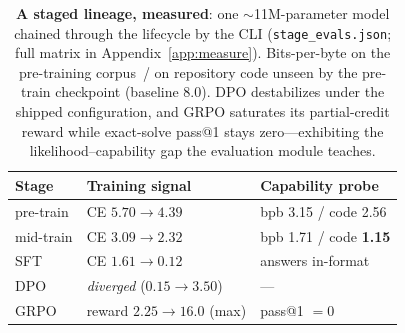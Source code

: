 \begin{table}[t]
\centering
\small
\begin{tabular}{@{}lll@{}}
\toprule
\textbf{Stage} & \textbf{Training signal} & \textbf{Capability probe} \\
\midrule
pre-train & CE $5.70{\to}4.39$ & bpb 3.15 / code 2.56 \\
mid-train & CE $3.09{\to}2.32$ & bpb 1.71 / code \textbf{1.15} \\
SFT       & CE $1.61{\to}0.12$ & answers in-format \\
DPO       & \emph{diverged} ($0.15{\to}3.50$) & --- \\
GRPO      & reward $2.25{\to}16.0$ (max) & pass@1 $=0$ \\
\bottomrule
\end{tabular}
\caption{\textbf{A staged lineage, measured}: one $\sim$11M-parameter model
chained through the lifecycle by the CLI
(\texttt{stage\_evals.json}; full matrix in Appendix~\ref{app:measure}).
Bits-per-byte on the pre-training corpus~/ on repository code unseen by the
pre-train checkpoint (baseline 8.0). DPO destabilizes under the shipped
configuration, and GRPO saturates its partial-credit reward while exact-solve
pass@1 stays zero---exhibiting the likelihood--capability gap the evaluation
module teaches.}
\label{tab:biography}
\end{table}
